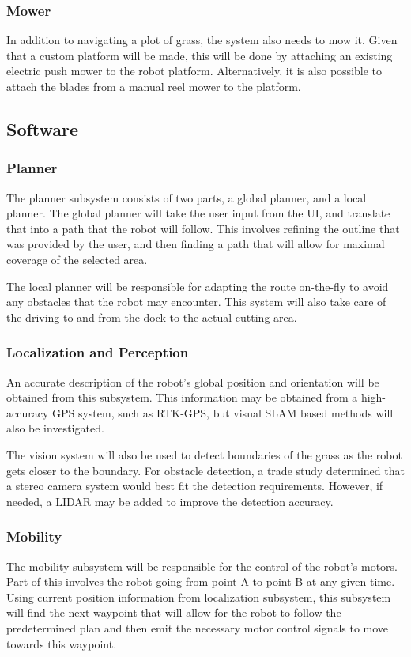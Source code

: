 \documentclass{article}
\begin{document}
		\subsubsection{Mower}
			In addition to navigating a plot of grass, the system also needs to mow it. Given that a custom platform will be made, this will be done by attaching an existing electric push mower to the robot platform. Alternatively, it is also possible to attach the blades from a manual reel mower to the platform. 
	
	\subsection{Software}
		\subsubsection{Planner}
			The planner subsystem consists of two parts, a global planner, and  a local planner. The global planner will take the user input from the UI, and translate that into a path that the robot will follow. This involves refining the outline that was provided by the user, and then finding a path that will allow for maximal coverage of the selected area. 
			
			The local planner will be responsible for adapting the route on-the-fly to avoid any obstacles that the robot may encounter. This system will also take care of the driving to and from the dock to the actual cutting area. 
			
		\subsubsection{Localization and Perception}
			An accurate description of the robot's global position and orientation will be obtained from this subsystem. This information may be obtained from a high-accuracy GPS system, such as RTK-GPS, but visual SLAM based methods will also be investigated. 
			
			The vision system will also be used to detect boundaries of the grass as the robot gets closer to the boundary. For obstacle detection, a trade study determined that a stereo camera system would best fit the detection requirements. However, if needed, a LIDAR may be added to improve the detection accuracy. 
		
		\subsubsection{Mobility}
			The mobility subsystem will be responsible for the control of the robot's motors. Part of this involves the robot going from point A to point B at any given time. Using current position information from localization subsystem, this subsystem will find the next waypoint that will allow for the robot to follow the predetermined plan and then emit the necessary motor control signals to move towards this waypoint. 
			
\end{document}
